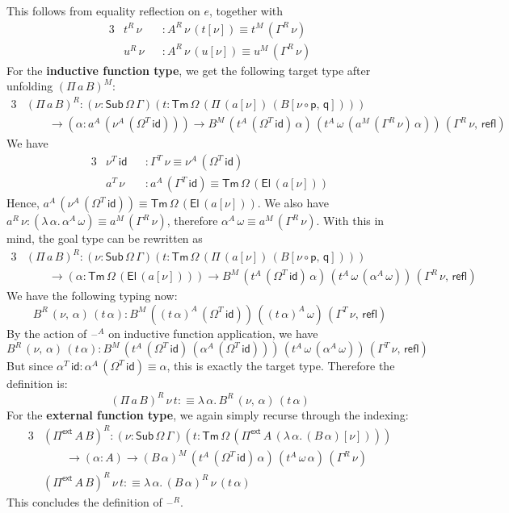 \documentclass[12pt,a4paper,twoside,openany]{book}
\theoremstyle{remark}
\theoremstyle{definition}
\theoremstyle{theorem}
\newcommand{\refl}{\mathsf{refl}}
\newcommand{\id}{\mathsf{id}}
\newcommand{\Sub}{\mathsf{Sub}}
\newcommand{\Tm}{\mathsf{Tm}}
\newcommand{\El}{\mathsf{El}}
\newcommand{\blank}{\mathord{\hspace{1pt}\text{--}\hspace{1pt}}}
\newcommand{\Pie}{\Pi^{\mathsf{ext}}}
\newcommand{\p}{\mathsf{p}}
\newcommand{\q}{\mathsf{q}}
\newcommand{\defn}{:\equiv}
\begin{document}
This follows from equality reflection on $e$, together with
\begin{alignat*}{3}
  & t^R\,\nu &&: A^R\,\nu\,(t[\nu]) \equiv t^M\,(\Gamma^R\,\nu)\\
  & u^R\,\nu &&: A^R\,\nu\,(u[\nu]) \equiv u^M\,(\Gamma^R\,\nu)
\end{alignat*}
For the \textbf{inductive function type}, we get the following target type after unfolding $(\Pi\,a\,B)^M$:
\begin{alignat*}{3}
 &(\Pi\,a\,B)^R : (\nu : \Sub\,\Omega\,\Gamma)(t : \Tm\,\Omega\,(\Pi\,(a[\nu])\,(B[\nu\circ\p,\,\q])))\\
 & \hspace{2em}\to (\alpha : a^A\,(\nu^A\,(\Omega^T\,\id))) \to B^M\,(t^A\,(\Omega^T\,\id)\,\alpha)\,(t^A\,\omega\,(a^M\,(\Gamma^R\,\nu)\,\alpha))\,(\Gamma^R\,\nu,\,\refl)
\end{alignat*}
We have
\begin{alignat*}{3}
  & \nu^T\,\id &&: \Gamma^T\,\nu \equiv \nu^A\,(\Omega^T\,\id) \\
  & a^T\,\nu   &&: a^A\,(\Gamma^T\,\id) \equiv \Tm\,\Omega\,(\El\,(a[\nu]))
\end{alignat*}
Hence, $a^A\,(\nu^A\,(\Omega^T\,\id)) \equiv \Tm\,\Omega\,(\El\,(a[\nu]))$. We
also have $a^R\,\nu : (\lambda\,\alpha.\,\alpha^A\,\omega) \equiv a^M\,(\Gamma^R\,\nu)$, therefore
$\alpha^A\,\omega \equiv a^M\,(\Gamma^R\,\nu)$. With this in mind, the goal type can be rewritten as
\begin{alignat*}{3}
 &(\Pi\,a\,B)^R : (\nu : \Sub\,\Omega\,\Gamma)(t : \Tm\,\Omega\,(\Pi\,(a[\nu])\,(B[\nu\circ\p,\,\q])))\\
 & \hspace{2em}\to (\alpha : \Tm\,\Omega\,(\El\,(a[\nu]))) \to B^M\,(t^A\,(\Omega^T\,\id)\,\alpha)\,(t^A\,\omega\,(\alpha^A\,\omega))\,(\Gamma^R\,\nu,\,\refl)
\end{alignat*}
We have the following typing now:
\[
  B^R\,(\nu,\,\alpha)\,(t\,\alpha) : B^M\,((t\,\alpha)^A\,(\Omega^T\,\id))\,((t\,\alpha)^A\,\omega)\,(\Gamma^T\,\nu,\,\refl)
\]
By the action of $\blank^A$ on inductive function application, we have
\[
   B^R\,(\nu,\,\alpha)\,(t\,\alpha) :
      B^M\,(t^A\,(\Omega^T\,\id)\,(\alpha^A\,(\Omega^T\,\id)))\,(t^A\,\omega\,(\alpha^A\,\omega))\,(\Gamma^T\,\nu,\,\refl)
\]
But since $\alpha^T\,\id : \alpha^A\,(\Omega^T\,\id) \equiv \alpha$, this is
exactly the target type. Therefore the definition is:
\[
  (\Pi\,a\,B)^R\,\nu\,t \defn \lambda\,\alpha.\,B^R\,(\nu,\,\alpha)\,(t\,\alpha)
\]
For the \textbf{external function type}, we again simply recurse through the indexing:
\begin{alignat*}{3}
  & (\Pie\,A\,B)^R : (\nu : \Sub\,\Omega\,\Gamma)(t : \Tm\,\Omega\,(\Pie\,A\,(\lambda\,\alpha.\,(B\,\alpha)[\nu])))\\
  & \hspace{2em}\to (\alpha : A) \to (B\,\alpha)^M\,(t^A\,(\Omega^T\,\id)\,\alpha)\,(t^A\,\omega\,\alpha)\,(\Gamma^R\,\nu)\\
  &(\Pie\,A\,B)^R\,\nu\,t \defn \lambda\,\alpha.\,(B\,\alpha)^R\,\nu\,(t\,\alpha)
\end{alignat*}
This concludes the definition of $\blank^R$.
\end{document}
